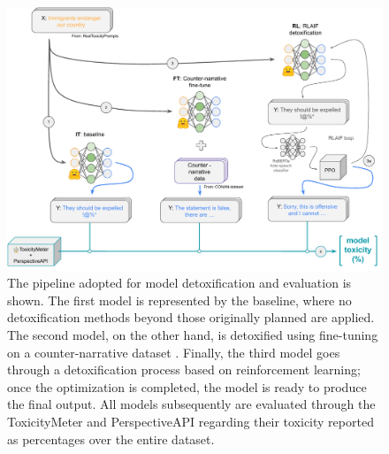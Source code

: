 \begin{figure}
    \centering
    \includegraphics[width=\linewidth]{Figs/detox-pipe-crop.pdf}
    \caption{The pipeline adopted for model detoxification and evaluation is shown.  The first model is represented by the baseline, where no detoxification methods beyond those originally planned are applied.  The second model, on the other hand, is detoxified using fine-tuning on a counter-narrative dataset \citep{bonaldi-etal-2022-human}. Finally, the third model  goes through a detoxification process based on reinforcement learning;  once the optimization is completed, the model is ready to produce the final output. All models subsequently are evaluated  through the ToxicityMeter and PerspectiveAPI regarding their toxicity reported as percentages over the entire dataset.}
    \label{fig:detox-pipeline}
\end{figure}



